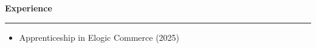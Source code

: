 {
    {\vspace{0.5cm} \hspace{-0.5cm} \Large \textbf{Experience}}
    \par\noindent\rule{\textwidth}{0.1mm}
    \begin{itemize}
        \item Apprenticeship in Elogic Commerce (2025)
    \end{itemize}
}
